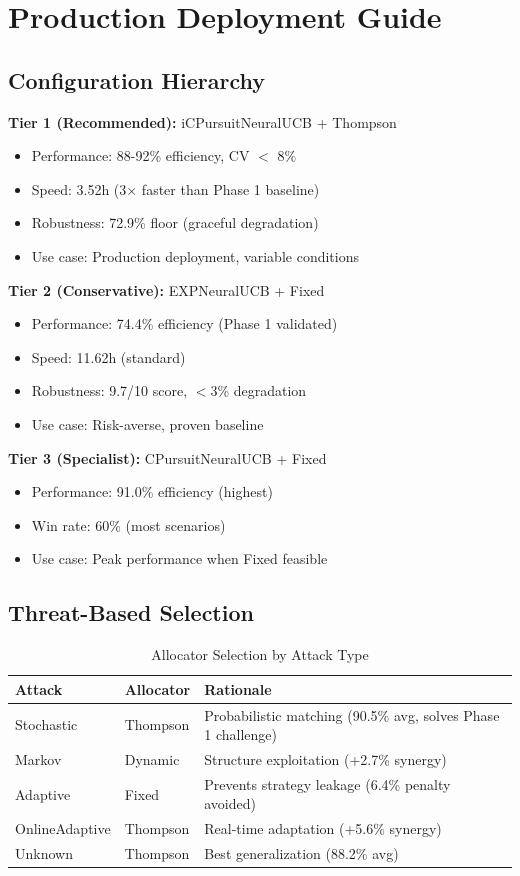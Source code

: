 \documentclass[11pt,a4paper]{article}
\begin{document}
\section{Production Deployment Guide}

\subsection{Configuration Hierarchy}

\textbf{Tier 1 (Recommended):} iCPursuitNeuralUCB + Thompson
\begin{itemize}
\item Performance: 88-92\% efficiency, CV $<$ 8\%
\item Speed: 3.52h (3× faster than Phase 1 baseline)
\item Robustness: 72.9\% floor (graceful degradation)
\item Use case: Production deployment, variable conditions
\end{itemize}

\textbf{Tier 2 (Conservative):} EXPNeuralUCB + Fixed
\begin{itemize}
\item Performance: 74.4\% efficiency (Phase 1 validated)
\item Speed: 11.62h (standard)
\item Robustness: 9.7/10 score, $<$3\% degradation
\item Use case: Risk-averse, proven baseline
\end{itemize}

\textbf{Tier 3 (Specialist):} CPursuitNeuralUCB + Fixed
\begin{itemize}
\item Performance: 91.0\% efficiency (highest)
\item Win rate: 60\% (most scenarios)
\item Use case: Peak performance when Fixed feasible
\end{itemize}

\subsection{Threat-Based Selection}

\begin{table}[h]
\centering\small
\caption{Allocator Selection by Attack Type}
\begin{tabular}{llp{5cm}}
\toprule
\textbf{Attack} & \textbf{Allocator} & \textbf{Rationale} \\
\midrule
Stochastic & Thompson & Probabilistic matching (90.5\% avg, solves Phase 1 challenge) \\
Markov & Dynamic & Structure exploitation (+2.7\% synergy) \\
Adaptive & Fixed & Prevents strategy leakage (6.4\% penalty avoided) \\
OnlineAdaptive & Thompson & Real-time adaptation (+5.6\% synergy) \\
Unknown & Thompson & Best generalization (88.2\% avg) \\
\bottomrule
\end{tabular}
\end{table}
\end{document}
